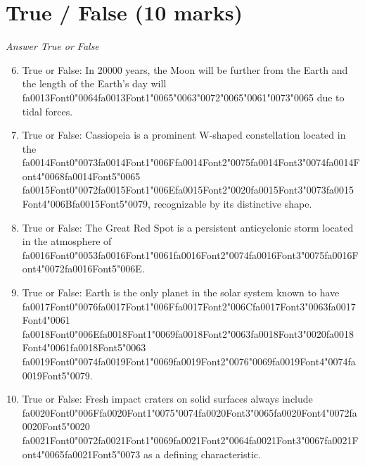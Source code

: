 \documentclass[12pt]{article}
\begin{document}
\section*{True / False (10 marks)}
\textit{Answer True or False}
\begin{enumerate}[label=\arabic*.]
\setcounter{enumi}{5}
\item True or False: In 20000 years, the Moon will be further from the Earth and the length of the Earth's day will {\csname fa0013Font0\endcsname\char"0064}{\csname fa0013Font1\endcsname\char"0065}{\char"0063}{\char"0072}{\char"0065}{\char"0061}{\char"0073}{\char"0065} due to tidal forces.
\item True or False: Cassiopeia is a prominent W-shaped constellation located in the {\csname fa0014Font0\endcsname\char"0073}{\csname fa0014Font1\endcsname\char"006F}{\csname fa0014Font2\endcsname\char"0075}{\csname fa0014Font3\endcsname\char"0074}{\csname fa0014Font4\endcsname\char"0068}{\csname fa0014Font5\endcsname\char"0065} {\csname fa0015Font0\endcsname\char"0072}{\csname fa0015Font1\endcsname\char"006E}{\csname fa0015Font2\endcsname\char"0020}{\csname fa0015Font3\endcsname\char"0073}{\csname fa0015Font4\endcsname\char"006B}{\csname fa0015Font5\endcsname\char"0079}, recognizable by its distinctive shape.
\item True or False: The Great Red Spot is a persistent anticyclonic storm located in the atmosphere of {\csname fa0016Font0\endcsname\char"0053}{\csname fa0016Font1\endcsname\char"0061}{\csname fa0016Font2\endcsname\char"0074}{\csname fa0016Font3\endcsname\char"0075}{\csname fa0016Font4\endcsname\char"0072}{\csname fa0016Font5\endcsname\char"006E}.
\item True or False: Earth is the only planet in the solar system known to have {\csname fa0017Font0\endcsname\char"0076}{\csname fa0017Font1\endcsname\char"006F}{\csname fa0017Font2\endcsname\char"006C}{\csname fa0017Font3\endcsname\char"0063}{\csname fa0017Font4\endcsname\char"0061} {\csname fa0018Font0\endcsname\char"006E}{\csname fa0018Font1\endcsname\char"0069}{\csname fa0018Font2\endcsname\char"0063}{\csname fa0018Font3\endcsname\char"0020}{\csname fa0018Font4\endcsname\char"0061}{\csname fa0018Font5\endcsname\char"0063} {\csname fa0019Font0\endcsname\char"0074}{\csname fa0019Font1\endcsname\char"0069}{\csname fa0019Font2\endcsname\char"0076}{\char"0069}{\csname fa0019Font4\endcsname\char"0074}{\csname fa0019Font5\endcsname\char"0079}.
\item True or False: Fresh impact craters on solid surfaces always include {\csname fa0020Font0\endcsname\char"006F}{\csname fa0020Font1\endcsname\char"0075}{\char"0074}{\csname fa0020Font3\endcsname\char"0065}{\csname fa0020Font4\endcsname\char"0072}{\csname fa0020Font5\endcsname\char"0020} {\csname fa0021Font0\endcsname\char"0072}{\csname fa0021Font1\endcsname\char"0069}{\csname fa0021Font2\endcsname\char"0064}{\csname fa0021Font3\endcsname\char"0067}{\csname fa0021Font4\endcsname\char"0065}{\csname fa0021Font5\endcsname\char"0073} as a defining characteristic.
\end{enumerate}
\end{document}
